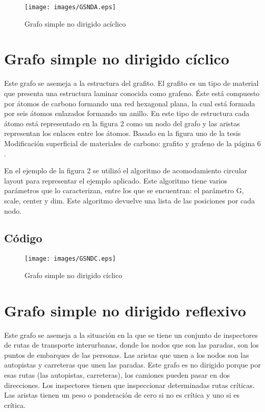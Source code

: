 \documentclass{article}
\begin{document}
\begin{figure}[H] 
    \centering
              \texttt{[image: images/GSNDA.eps]}
\caption{Grafo simple no dirigido acíclico}
\label{fig:seq1}
\end{figure}

\section{Grafo simple no dirigido cíclico}

Este grafo se asemeja a la estructura del grafito. El grafito es un tipo de material que presenta una estructura laminar conocida como grafeno. Éste está compuesto por átomos de carbono formando una red hexagonal plana, la cual está formada por seis átomos enlazados formando un anillo. En este tipo de estructura cada átomo está representado en la figura  2 como un nodo del grafo y las aristas representan los enlaces entre los átomos. Basado en la figura uno de la tesis Modificación superficial de materiales de carbono: grafito y grafeno de la página 6 \cite{pablosolisfernandez}. 

En el ejemplo de la figura 2 se utilizó el algoritmo de acomodamiento circular layout para representar el ejemplo aplicado. Este algoritmo tiene varios parámetros que lo caracterizan, entre los que se encuentran: el parámetro G, scale, center y dim. Este algoritmo devuelve una lista de las posiciones por cada nodo\cite{circularlayout}.   

\subsection{Código}



\begin{figure}[H]
    \centering
        \texttt{[image: images/GSNDC.eps]}
\caption{Grafo simple no dirigido cíclico}
\label{fig:seq1}
\end{figure}

\section{Grafo simple no dirigido reflexivo}

Este grafo se asemeja a la situación en la que se tiene un conjunto de inspectores de rutas de transporte interurbanas, donde los nodos que son las paradas, son los puntos de embarques de las personas.  Las aristas que unen a los nodos son las autopistas y carreteras que unen las paradas. Este grafo es no dirigido porque por esas rutas (las autopistas, carreteras), los camiones pueden pasar en dos direcciones. Los inspectores tienen que inspeccionar determinadas rutas críticas. Las aristas tienen un peso o ponderación de cero si no es crítica y uno si es crítica.
\end{document}
